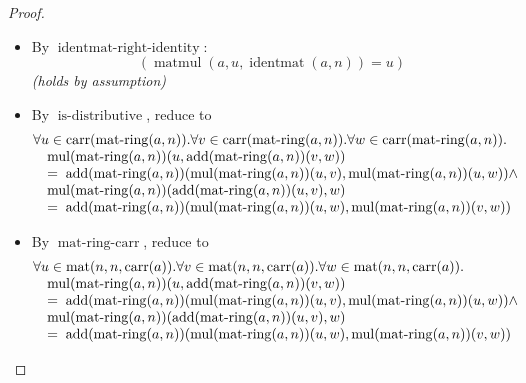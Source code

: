 \documentclass[11pt]{article}
\theoremstyle{plain}
\begin{document}
\begin{proof}
\begin{itemize}[leftmargin=2.8em, itemsep=4pt, parsep=1pt]
  \item[\textbf{106--107}] By $\operatorname{identmat\text{-}right\text{-}identity}$:
\begin{equation*}
(\operatorname{matmul}(a, u, \operatorname{identmat}(a, n)) = u)
\end{equation*}
  \emph{(holds by assumption)}
  \item[\textbf{108}] By $\operatorname{is\text{-}distributive}$, reduce to
\begin{equation*}
\begin{array}{@{}l@{}} \forall u \in \operatorname{carr}(\operatorname{mat\text{-}ring}(a, n)). \forall v \in \operatorname{carr}(\operatorname{mat\text{-}ring}(a, n)). \forall w \in \operatorname{carr}(\operatorname{mat\text{-}ring}(a, n)). \\ \quad \operatorname{mul}(\operatorname{mat\text{-}ring}(a, n))(u, \operatorname{add}(\operatorname{mat\text{-}ring}(a, n))(v, w)) \\ \quad =\; \operatorname{add}(\operatorname{mat\text{-}ring}(a, n))(\operatorname{mul}(\operatorname{mat\text{-}ring}(a, n))(u, v), \operatorname{mul}(\operatorname{mat\text{-}ring}(a, n))(u, w)) \wedge \\ \quad \operatorname{mul}(\operatorname{mat\text{-}ring}(a, n))(\operatorname{add}(\operatorname{mat\text{-}ring}(a, n))(u, v), w) \\ \quad =\; \operatorname{add}(\operatorname{mat\text{-}ring}(a, n))(\operatorname{mul}(\operatorname{mat\text{-}ring}(a, n))(u, w), \operatorname{mul}(\operatorname{mat\text{-}ring}(a, n))(v, w)) \end{array}
\end{equation*}

  \item[\textbf{109}] By $\operatorname{mat\text{-}ring\text{-}carr}$, reduce to
\begin{equation*}
\begin{array}{@{}l@{}} \forall u \in \operatorname{mat}(n, n, \operatorname{carr}(a)). \forall v \in \operatorname{mat}(n, n, \operatorname{carr}(a)). \forall w \in \operatorname{mat}(n, n, \operatorname{carr}(a)). \\ \quad \operatorname{mul}(\operatorname{mat\text{-}ring}(a, n))(u, \operatorname{add}(\operatorname{mat\text{-}ring}(a, n))(v, w)) \\ \quad =\; \operatorname{add}(\operatorname{mat\text{-}ring}(a, n))(\operatorname{mul}(\operatorname{mat\text{-}ring}(a, n))(u, v), \operatorname{mul}(\operatorname{mat\text{-}ring}(a, n))(u, w)) \wedge \\ \quad \operatorname{mul}(\operatorname{mat\text{-}ring}(a, n))(\operatorname{add}(\operatorname{mat\text{-}ring}(a, n))(u, v), w) \\ \quad =\; \operatorname{add}(\operatorname{mat\text{-}ring}(a, n))(\operatorname{mul}(\operatorname{mat\text{-}ring}(a, n))(u, w), \operatorname{mul}(\operatorname{mat\text{-}ring}(a, n))(v, w)) \end{array}
\end{equation*}


\end{itemize}
\end{proof}
\end{document}
